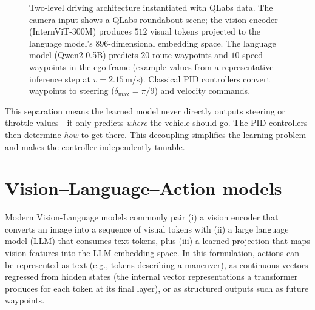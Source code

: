 \begin{figure}[ht]
{%
}%
\caption[Two-level driving architecture with QLabs data.]{Two-level driving architecture instantiated with QLabs data. The camera input shows a QLabs roundabout scene; the vision encoder (InternViT-300M) produces $512$ visual tokens projected to the language model's $896$-dimensional embedding space. The language model (Qwen2-0.5B) predicts $20$ route waypoints and $10$ speed waypoints in the ego frame (example values from a representative inference step at $v = 2.15$\,m/s). Classical PID controllers convert waypoints to steering ($\delta_{\max} = \pi/9$) and velocity commands.}
\label{fig:two-level}
\end{figure}

This separation means the learned model never directly outputs steering or throttle values---it only predicts \emph{where} the vehicle should go. The PID controllers then determine \emph{how} to get there. This decoupling simplifies the learning problem and makes the controller independently tunable.

\section{Vision--Language--Action models}
Modern Vision-Language models commonly pair (i) a vision encoder that converts an image into a sequence of visual tokens with (ii) a large language model (LLM) that consumes text tokens, plus (iii) a learned projection that maps vision features into the LLM embedding space. In this formulation, actions can be represented as text (e.g., tokens describing a maneuver), as continuous vectors regressed from hidden states (the internal vector representations a transformer produces for each token at its final layer), or as structured outputs such as future waypoints.

